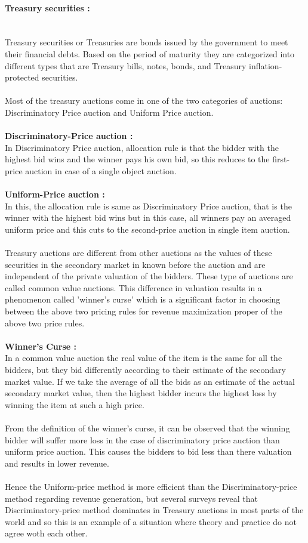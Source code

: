 \documentclass[a4paper]{article}
\begin{document}
\paragraph{Treasury securities :}\\Treasury securities or Treasuries are bonds issued by the government to meet their financial debts. Based on the period of maturity they are categorized into different types that are Treasury bills, notes, bonds, and Treasury inflation-protected securities.
\\\\
Most of the treasury auctions come in one of the two categories of auctions: Discriminatory Price auction and Uniform Price auction.
\\\\
\textbf{Discriminatory-Price auction :} \\In Discriminatory Price auction, allocation rule is that the bidder with the highest bid wins and the winner pays his own bid, so this reduces to the first-price auction in case of a single object auction.
\\\\
\textbf{Uniform-Price auction :} \\In this, the allocation rule is same as Discriminatory Price auction, that is the winner with the highest bid wins but in this case, all winners pay an averaged uniform price and this cuts to the second-price auction in single item auction.
\\\\
Treasury auctions are different from other auctions as the values of these securities in the secondary market in known before the auction and are independent of the private valuation of the bidders. These type of auctions are called common value auctions. This difference in valuation results in a phenomenon called 'winner's curse' which is a significant factor in choosing between the above two pricing rules for revenue maximization proper of the above two price rules.
\\\\
\textbf{Winner's Curse :}\\ In a common value auction the real value of the item is the same for all the bidders, but they bid differently according to their estimate of the secondary market value. If we take the average of all the bids as an estimate of the actual secondary market value, then the highest bidder incurs the highest loss by winning the item at such a high price.
\\\\
From the definition of the winner's curse, it can be observed that the winning bidder will suffer more loss in the case of discriminatory price auction than uniform price auction. This causes the bidders to bid less than there valuation and results in lower revenue.
\\\\
Hence the Uniform-price method is more efficient than the Discriminatory-price method regarding revenue generation, but several surveys reveal that Discriminatory-price method dominates in Treasury auctions in most parts of the world and so this is an example of a situation where theory and practice do not agree woth each other.
\end{document}
